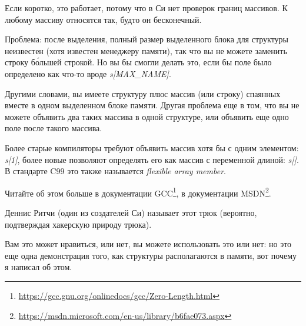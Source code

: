 Если коротко, это работает, потому что в Си нет проверок границ массивов. К любому массиву относятся так, будто он бесконечный.

Проблема: после выделения, полный размер выделенного блока для структуры неизвестен (хотя известен менеджеру памяти),
так что вы не можете заменить строку б\'{о}льшей строкой.
Но вы бы смогли делать это, если бы поле было определено как что-то вроде \emph{s[MAX\_NAME]}.

Другими словами, вы имеете структуру плюс массив (или строку) спаянных вместе в одном выделенном блоке памяти.
Другая проблема еще в том, что вы не можете объявить два таких массива в одной структуре, или объявить еще одно поле
после такого массива.

Более старые компиляторы требуют объявить массив хотя бы с одним элементом: \emph{s[1]}, более новые позволяют
определять его как массив с переменной длиной: \emph{s[]}.
В стандарте C99 это также называется \emph{flexible array member}.

Читайте об этом больше в документации GCC\footnote{\url{https://gcc.gnu.org/onlinedocs/gcc/Zero-Length.html}},
в документации MSDN\footnote{\url{https://msdn.microsoft.com/en-us/library/b6fae073.aspx}}.

Деннис Ритчи (один из создателей Си) называет этот трюк  
(вероятно, подтверждая хакерскую природу трюка).

Вам это может нравиться, или нет, вы можете использовать это или нет:
но это еще одна демонстрация того, как структуры располагаются в памяти, вот почему я написал об этом.

